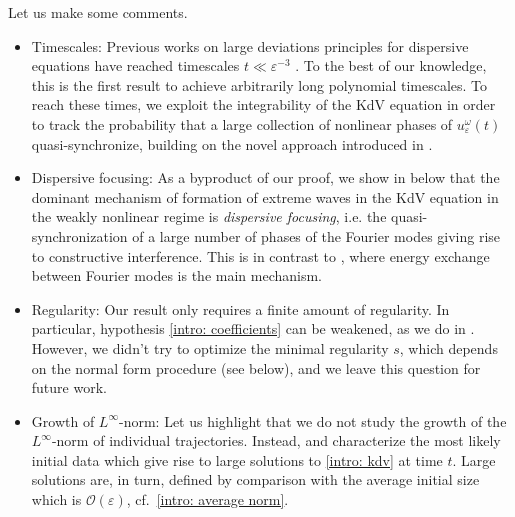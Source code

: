 \documentclass[a4paper,10pt,reqno]{article}
\theoremstyle{definition}
\theoremstyle{plain}
\theoremstyle{plain}
\theoremstyle{definition}
\theoremstyle{plain}
\theoremstyle{plain}
\theoremstyle{plain}
\theoremstyle{definition}
\theoremstyle{definition}
\def \O{\mathcal{O}}
\begin{document}
Let us make some comments.

\begin{itemize}
    \item[1.] {\sc Timescales}: Previous works on large deviations principles for dispersive equations have reached timescales $t\ll \varepsilon^{-3}$ \cite{grande,grande2,bertimasperograndestaffilani}. To the best of our knowledge, this is the first result to achieve arbitrarily long polynomial timescales. To reach these times, we exploit the integrability of the KdV equation in order to track the probability that a large collection of nonlinear phases of $u_{\varepsilon}^{\omega}(t)$ quasi-synchronize, building on the novel approach introduced in \cite{bertimasperograndestaffilani}.

    \item[2.] {\sc Dispersive focusing}: As a byproduct of our proof, we show in  below that the dominant mechanism of formation of extreme waves in the KdV equation in the weakly nonlinear regime is \emph{dispersive focusing}, i.e. the quasi-synchronization of a large number of phases of the Fourier modes giving rise to constructive interference. This is in contrast to \cite{grande2}, where energy exchange between Fourier modes is the main mechanism. %

    \item[3.] {\sc Regularity}:  
    Our result only requires a finite amount of regularity. In particular, hypothesis \eqref{intro: coefficients} can be weakened, as we do in . However, we didn't try to optimize the minimal regularity $s$, which depends on the normal form procedure (see  below), and we leave this question for future work.   

    \item[4.] {\sc Growth of $L^{\infty}$-norm}: Let us highlight that we do not study the growth of the $L^{\infty}$-norm of individual trajectories. Instead,  and  characterize the most likely initial data which give rise to large solutions to \eqref{intro: kdv} at time $t$. Large solutions are, in turn, defined by comparison with the average initial size which is $\O(\varepsilon)$, cf.~\eqref{intro: average norm}.


\end{itemize}
\end{document}

